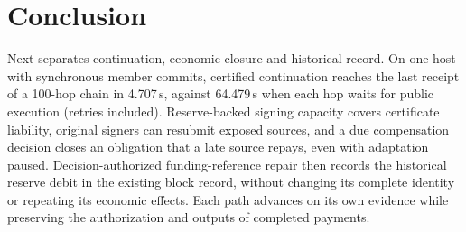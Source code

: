 \section{Conclusion}
\label{sec:conclusion}

Next separates continuation, economic closure and historical record. On one host
with synchronous member commits, certified continuation reaches the last receipt of a
100-hop chain in 4.707\,s, against 64.479\,s when each hop waits for public execution
(retries included). Reserve-backed signing capacity covers certificate liability,
original signers can resubmit exposed sources, and a due compensation decision closes
an obligation that a late source repays, even with adaptation paused. Decision-authorized funding-reference repair
then records the historical reserve debit in the existing block record,
without changing its complete identity or repeating its economic effects. Each path advances on its own evidence while preserving the authorization and outputs of completed payments.
